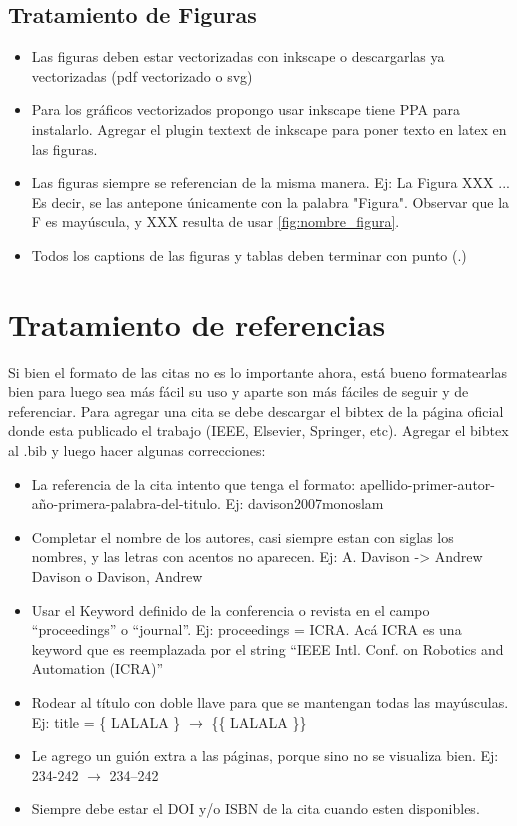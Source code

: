 \documentclass[a4paper,	11pt]{article}
\begin{document}
\subsection{Tratamiento de Figuras}
%
\begin{itemize}
    \item Las figuras deben estar vectorizadas con inkscape o descargarlas ya vectorizadas (pdf vectorizado o svg)
    \item Para los gráficos vectorizados propongo usar inkscape tiene PPA para instalarlo. Agregar el plugin textext de inkscape para poner texto en latex en las figuras.
    \item Las figuras siempre se referencian de la misma manera. Ej: La Figura XXX ... Es decir, se las antepone únicamente con la palabra "Figura". Observar que la F es mayúscula, y XXX resulta de usar \ref{fig:nombre_figura}.
    \item Todos los captions de las figuras y tablas deben terminar con punto (.)
\end{itemize}


\section{Tratamiento de referencias}
Si bien el formato de las citas no es lo importante ahora, está bueno formatearlas bien para luego sea más fácil su uso y aparte son más fáciles de seguir y de referenciar. Para agregar una cita se debe descargar el bibtex de la página oficial donde esta publicado el trabajo (IEEE, Elsevier, Springer, etc). Agregar el bibtex al .bib y luego hacer algunas correcciones:
\begin{itemize}
    \item La referencia de la cita intento que tenga el formato: apellido-primer-autor-año-primera-palabra-del-titulo. Ej: davison2007monoslam
    \item Completar el nombre de los autores, casi siempre estan con siglas los nombres, y las letras con acentos no aparecen. Ej: A. Davison -> Andrew Davison o Davison, Andrew
    \item Usar el Keyword definido de la conferencia o revista en el campo ``proceedings'' o ``journal''. Ej: proceedings = ICRA. Acá ICRA es una keyword que es reemplazada por el string ``IEEE Intl. Conf. on Robotics and Automation (ICRA)''
    \item Rodear al título con doble llave para que se mantengan todas las mayúsculas. Ej: title = \{ LALALA \} $\rightarrow$ \{\{ LALALA \}\}
    \item Le agrego un guión extra a las páginas, porque sino no se visualiza bien. Ej: 234-242 $\rightarrow$ 234--242
    \item Siempre debe estar el DOI y/o ISBN de la cita cuando esten disponibles.
\end{itemize}
\end{document}
